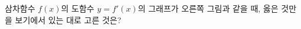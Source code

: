 \noindent\begin{minipage}[t]{0.58\linewidth}\vspace{0pt}\raggedright 삼차함수 $f(x)$의 도함수 $y=f'(x)$의 그래프가 오른쪽 그림과 같을 때, 옳은 것만을 보기에서 있는 대로 고른 것은? \end{minipage}\hfill\begin{minipage}[t]{0.4\linewidth}\vspace{0pt}\centering \resizebox{\ifdim\width>\linewidth\linewidth\else\width\fi}{!}{}\end{minipage}\par
\noindent {}
